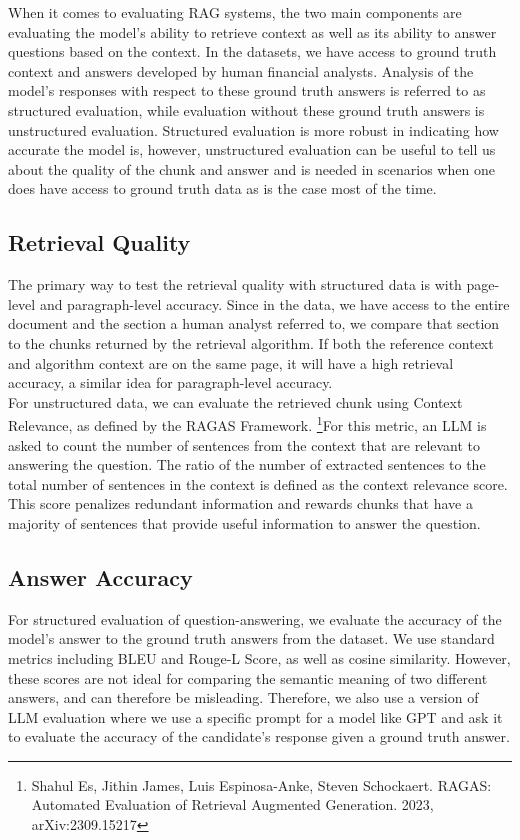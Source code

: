 \documentclass{article}
\begin{document}
    When it comes to evaluating RAG systems, the two main components are evaluating the model's ability to retrieve context as well as its ability to answer questions based on the context. In the datasets, we have access to ground truth context and answers developed by human financial analysts. Analysis of the model's responses with respect to these ground truth answers is referred to as structured evaluation, while evaluation without these ground truth answers is unstructured evaluation. Structured evaluation is more robust in indicating how accurate the model is, however, unstructured evaluation can be useful to tell us about the quality of the chunk and answer and is needed in scenarios when one does have access to ground truth data as is the case most of the time. 

    \subsection{Retrieval Quality}
    The primary way to test the retrieval quality with structured data is with page-level and paragraph-level accuracy. Since in the data, we have access to the entire document and the section a human analyst referred to, we compare that section to the chunks returned by the retrieval algorithm. If both the reference context and algorithm context are on the same page, it will have a high retrieval accuracy, a similar idea for paragraph-level accuracy. 
    \\
    
    \noindent For unstructured data, we can evaluate the retrieved chunk using Context Relevance, as defined by the RAGAS Framework. \footnote{ Shahul Es, Jithin James, Luis Espinosa-Anke, Steven Schockaert. RAGAS: Automated Evaluation of Retrieval Augmented Generation. 2023, arXiv:2309.15217}For this metric, an LLM is asked to count the number of sentences from the context that are relevant to answering the question. The ratio of the number of extracted sentences to the total number of sentences in the context is defined as the context relevance score. This score penalizes redundant information and rewards chunks that have a majority of sentences that provide useful information to answer the question. 

    \subsection{Answer Accuracy}
    For structured evaluation of question-answering, we evaluate the accuracy of the model's answer to the ground truth answers from the dataset. We use standard metrics including BLEU and Rouge-L Score, as well as cosine similarity. However, these scores are not ideal for comparing the semantic meaning of two different answers, and can therefore be misleading. Therefore, we also use a version of LLM evaluation where we use a specific prompt for a model like GPT and ask it to evaluate the accuracy of the candidate's response given a ground truth answer. 
    \\
    
\end{document}
